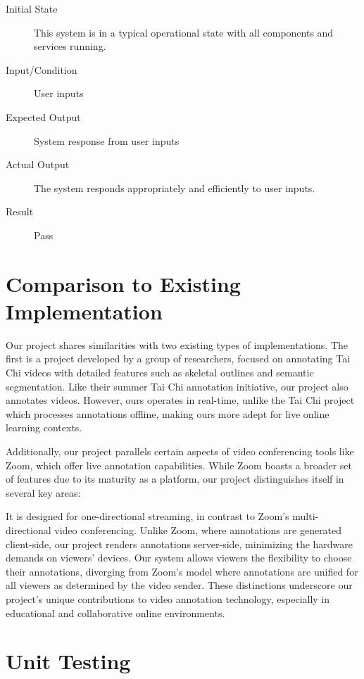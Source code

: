 \documentclass[12pt, titlepage]{article}
\begin{document}
\begin{enumerate}[NFR-T1]
    \begin{description}
    \item[Initial State] This system is in a typical operational state with all
      components and services running.
    \item[Input/Condition] User inputs
    \item[Expected Output] System response from user inputs
    \item[Actual Output] The system responds appropriately and efficiently to user inputs.
    \item[Result] Pass 
    \end{description}
  \end{enumerate}
	
\section{Comparison to Existing Implementation}	

Our project shares similarities with two existing types of implementations. The first is a project developed by a group of researchers, focused on annotating Tai Chi videos with detailed features such as skeletal outlines and semantic segmentation. Like their summer Tai Chi annotation initiative, our project also annotates videos. However, ours operates in real-time, unlike the Tai Chi project which processes annotations offline, making ours more adept for live online learning contexts.

Additionally, our project parallels certain aspects of video conferencing tools like Zoom, which offer live annotation capabilities. While Zoom boasts a broader set of features due to its maturity as a platform, our project distinguishes itself in several key areas:

It is designed for one-directional streaming, in contrast to Zoom's multi-directional video conferencing.
Unlike Zoom, where annotations are generated client-side, our project renders annotations server-side, minimizing the hardware demands on viewers' devices.
Our system allows viewers the flexibility to choose their annotations, diverging from Zoom's model where annotations are unified for all viewers as determined by the video sender.
These distinctions underscore our project's unique contributions to video annotation technology, especially in educational and collaborative online environments.

\section{Unit Testing}
\end{document}
